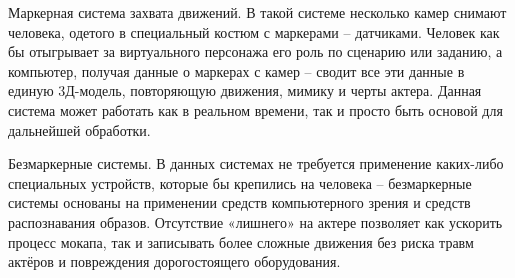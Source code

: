 Маркерная система захвата движений. В такой системе несколько камер снимают человека, одетого в специальный костюм с маркерами – датчиками. Человек как бы отыгрывает за виртуального персонажа его роль по сценарию или заданию, а компьютер, получая данные о маркерах с камер – сводит все эти данные в единую 3Д-модель, повторяющую движения, мимику и черты актера. Данная система может работать как в реальном времени, так и просто быть основой для дальнейшей обработки.

Безмаркерные системы. В данных системах не требуется применение каких-либо специальных устройств, которые бы крепились на человека – безмаркерные системы основаны на применении средств компьютерного зрения и средств распознавания образов. Отсутствие «лишнего» на актере позволяет как ускорить процесс мокапа, так и записывать более сложные движения без риска травм актёров и повреждения дорогостоящего оборудования.

